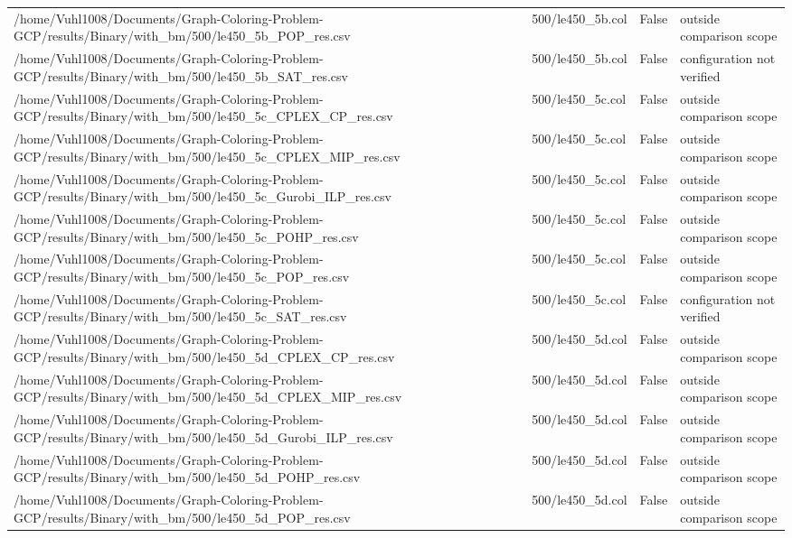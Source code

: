 \begin{table}[htbp]
\begin{tabular}{llll}
/home/Vuhl1008/Documents/Graph-Coloring-Problem-GCP/results/Binary/with\_bm/500/le450\_5b\_POP\_res.csv & 500/le450\_5b.col & False & outside comparison scope \\
/home/Vuhl1008/Documents/Graph-Coloring-Problem-GCP/results/Binary/with\_bm/500/le450\_5b\_SAT\_res.csv & 500/le450\_5b.col & False & configuration not verified \\
/home/Vuhl1008/Documents/Graph-Coloring-Problem-GCP/results/Binary/with\_bm/500/le450\_5c\_CPLEX\_CP\_res.csv & 500/le450\_5c.col & False & outside comparison scope \\
/home/Vuhl1008/Documents/Graph-Coloring-Problem-GCP/results/Binary/with\_bm/500/le450\_5c\_CPLEX\_MIP\_res.csv & 500/le450\_5c.col & False & outside comparison scope \\
/home/Vuhl1008/Documents/Graph-Coloring-Problem-GCP/results/Binary/with\_bm/500/le450\_5c\_Gurobi\_ILP\_res.csv & 500/le450\_5c.col & False & outside comparison scope \\
/home/Vuhl1008/Documents/Graph-Coloring-Problem-GCP/results/Binary/with\_bm/500/le450\_5c\_POHP\_res.csv & 500/le450\_5c.col & False & outside comparison scope \\
/home/Vuhl1008/Documents/Graph-Coloring-Problem-GCP/results/Binary/with\_bm/500/le450\_5c\_POP\_res.csv & 500/le450\_5c.col & False & outside comparison scope \\
/home/Vuhl1008/Documents/Graph-Coloring-Problem-GCP/results/Binary/with\_bm/500/le450\_5c\_SAT\_res.csv & 500/le450\_5c.col & False & configuration not verified \\
/home/Vuhl1008/Documents/Graph-Coloring-Problem-GCP/results/Binary/with\_bm/500/le450\_5d\_CPLEX\_CP\_res.csv & 500/le450\_5d.col & False & outside comparison scope \\
/home/Vuhl1008/Documents/Graph-Coloring-Problem-GCP/results/Binary/with\_bm/500/le450\_5d\_CPLEX\_MIP\_res.csv & 500/le450\_5d.col & False & outside comparison scope \\
/home/Vuhl1008/Documents/Graph-Coloring-Problem-GCP/results/Binary/with\_bm/500/le450\_5d\_Gurobi\_ILP\_res.csv & 500/le450\_5d.col & False & outside comparison scope \\
/home/Vuhl1008/Documents/Graph-Coloring-Problem-GCP/results/Binary/with\_bm/500/le450\_5d\_POHP\_res.csv & 500/le450\_5d.col & False & outside comparison scope \\
/home/Vuhl1008/Documents/Graph-Coloring-Problem-GCP/results/Binary/with\_bm/500/le450\_5d\_POP\_res.csv & 500/le450\_5d.col & False & outside comparison scope \\

\end{tabular}
\end{table}
